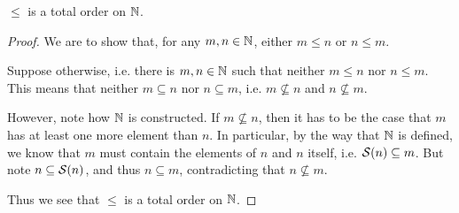 \begin{proposition}\label{prop:leq-is-total-order}
    $\leq$ is a total order on $\mathbb{N}$.
\end{proposition}
\begin{proof}
    We are to show that, for any $m, n \in \mathbb{N}$, either $m \leq n$ or $n \leq m$.

    Suppose otherwise, i.e. there is $m, n \in \mathbb{N}$ such that neither $m \leq n$ nor $n \leq m$. This means that neither $m \subseteq n$ nor $n \subseteq m$, i.e. $m \not\subseteq n$ and $n \not\subseteq m$.

    However, note how $\mathbb{N}$ is constructed. If $m \not\subseteq n$, then it has to be the case that $m$ has at least one more element than $n$. In particular, by the way that $\mathbb{N}$ is defined, we know that $m$ must contain the elements of $n$ and $n$ itself, i.e. ${\mathcal{S}(n)} \subseteq m$. But note $n \subseteq {\mathcal{S}(n)}$, and thus $n \subseteq m$, contradicting that $n \not\subseteq m$.

    Thus we see that $\leq$ is a total order on $\mathbb{N}$.
\end{proof}
